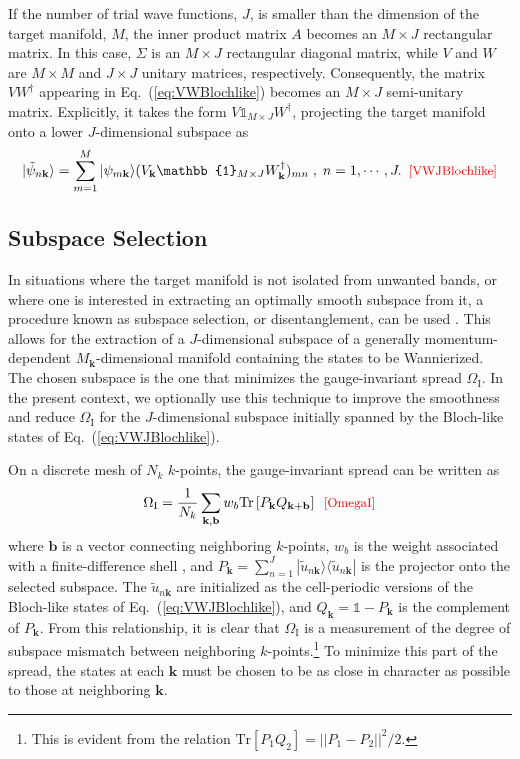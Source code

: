 \documentclass[galley,aps,pra,10pt,amsmath,amssymb,
    superscriptaddress,nofootinbib,longbibliography]{revtex4-2}
\def\Red#1{\textcolor{red}{#1}}
\newcounter{comm}
\newcommand{\seclab}[1]{\label{sec:#1}{\Red{\small\;\;[sec:~#1]}}}
\newcommand{\eqlab}[1]{\Red{\hbox{\small\;\;[#1]}}\label{eq:#1}}
\newcommand{\eqlab}[1]{\label{eq:#1}}
\newcommand{\seclab}[1]{\label{sec:#1}}
\newcommand{\eq}[1]{Eq.~(\ref{eq:#1})}
\begin{document}
If the number of trial wave functions, $J$, is smaller than the dimension of the target manifold, $M$, the inner product matrix $A$ becomes an $M \times J$ rectangular matrix. In this case, $\Sigma$ is an $M\times J$ rectangular diagonal matrix, while $V$ and $W$ are $M\times M$ and $J \times J$ unitary matrices, respectively. Consequently, the matrix $VW^{\dagger}$ appearing in \eq{VWBlochlike} becomes an $M \times J$ semi-unitary matrix. Explicitly, it takes the form $V \mathbb{1}_{M \times J} W^{\dagger}$, projecting the target manifold onto a lower $J$-dimensional subspace as
\begin{equation}
|\tilde{\psi}_{n\mathbf{k}} \rangle = \sum_{m=1}^M |\psi_{m\mathbf{k}} \rangle (V_{\mathbf{k}}\mathbb{1}_{M \times J}W_{\mathbf{k}}^{\dagger})_{mn} \;,\;n=1,\cdots, J .
\eqlab{VWJBlochlike}
\end{equation}

\subsection{Subspace Selection}
\seclab{selection}

In situations where the target manifold is not isolated from unwanted bands, or where one is interested in extracting an optimally smooth subspace from it, a procedure known as subspace selection, or disentanglement, can be used \cite{souza2001}. This allows for the extraction of a $J$-dimensional subspace of a generally momentum-dependent $M_{\mathbf{k}}$-dimensional manifold containing the states to be Wannierized. The chosen subspace is the one that minimizes the gauge-invariant spread $\Omega_\textrm{I}$. In the present context, we optionally use this technique to improve the smoothness and reduce $\Omega_\textrm{I}$ for the $J$-dimensional subspace initially spanned by the Bloch-like states of \eq{VWJBlochlike}.

On a discrete mesh of $N_k$ $k$-points, the gauge-invariant spread can be written as
\begin{equation}
    \Omega_\textrm{I} = \frac{1}{N_k} \sum_{\mathbf{k}, \mathbf{b}} w_b \text{Tr} \left[  P_{\mathbf{k}} Q_{\mathbf{k+b}}  \right] 
\eqlab{OmegaI}
\end{equation}
where $\mathbf{b}$ is a vector connecting neighboring $k$-points, $w_b$ is the weight associated with a finite-difference shell \cite{marzari1997}, and $P_{\mathbf{k}} = \sum_{n=1}^{J} |\tilde{u}_{n\mathbf{k}} \rangle \langle \tilde{u}_{n\mathbf{k}} |$ is the projector onto the selected subspace. The $\tilde{u}_{n\mathbf{k}}$ are initialized as the cell-periodic versions of the Bloch-like states of \eq{VWJBlochlike}, and $Q_{\mathbf{k}} = \mathbb{1} - P_{\mathbf{k}}$ is the complement of $P_{\mathbf{k}}$. From this relationship, it is clear that $\Omega_\textrm{I}$ is a measurement of the degree of subspace mismatch between neighboring $k$-points.\footnote{This is evident from the relation $\text{Tr} \left[  P_{1} Q_{2}  \right] = || P_1 - P_2||^2/2$.} To minimize this part of the spread, the states at each $\mathbf{k}$ must be chosen to be as close in character as possible to those at neighboring $\mathbf{k}$.
\end{document}
